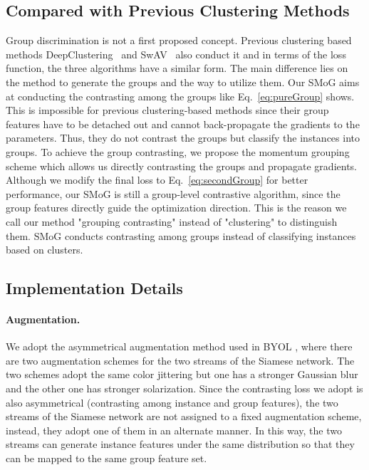 \documentclass[runningheads]{style/llncs}
\begin{document}
\subsection{Compared with Previous Clustering Methods}
Group discrimination is not a first proposed concept. Previous clustering based methods DeepClustering~\cite{deepcluster} and SwAV~\cite{swav} also conduct it and in terms of the loss function, the three algorithms have a similar form. The main difference lies on the method to generate the groups and the way to utilize them. Our SMoG aims at conducting the contrasting among the groups like Eq.~\ref{eq:pureGroup} shows. This is impossible for previous clustering-based methods since their group features have to be detached out and cannot back-propagate the gradients to the parameters. Thus, they do not contrast the groups but classify the instances into groups. To achieve the group contrasting, we propose the momentum grouping scheme which allows us directly contrasting the groups and propagate gradients. Although we modify the final loss to Eq.~\ref{eq:secondGroup} for better performance, our SMoG is still a group-level contrastive algorithm, since the group features directly guide the optimization direction. This is the reason we call our method "grouping contrasting" instead of "clustering" to distinguish them. SMoG conducts contrasting among groups instead of classifying instances based on clusters.

\subsection{Implementation Details}

\paragraph{Augmentation.}
We adopt the asymmetrical augmentation method used in BYOL \cite{byol}, where there are two augmentation schemes for the two streams of the Siamese network. The two schemes adopt the same color jittering but one has a stronger Gaussian blur and the other one has stronger solarization. Since the contrasting loss we adopt is also asymmetrical (contrasting among instance and group features), the two streams of the Siamese network are not assigned to a fixed augmentation scheme, instead, they adopt one of them in an alternate manner. In this way, the two streams can generate instance features under the same distribution so that they can be mapped to the same group feature set. 
\end{document}

